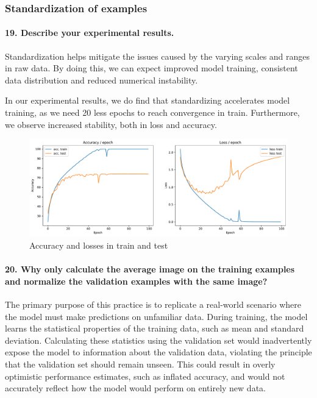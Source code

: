 \documentclass{article}
\theoremstyle{plain}%
\theoremstyle{definition}
\theoremstyle{remark}
\begin{document}
\subsubsection{Standardization of examples}
\paragraph{19. Describe your experimental results.}

Standardization helps mitigate the issues caused by the varying scales and ranges in raw data. By doing this, we can expect improved model training, consistent data distribution and reduced numerical instability.

In our experimental results, we do find that standardizing accelerates model training, as we need 20 less epochs to reach convergence in train. Furthermore, we observe increased stability, both in loss and accuracy.

\begin{figure}[H]
    \centering
    \includegraphics*[width=\textwidth]{figs/CNN/standardization.pdf}
    \caption{Accuracy and losses in train and test}
    \label{fig:standardization}
\end{figure}

\paragraph{20. Why only calculate the average image on the training examples and normalize the validation examples with the same image?}

The primary purpose of this practice is to replicate a real-world scenario where the model must make predictions on unfamiliar data. During training, the model learns the statistical properties of the training data, such as mean and standard deviation. Calculating these statistics using the validation set would inadvertently expose the model to information about the validation data, violating the principle that the validation set should remain unseen. This could result in overly optimistic performance estimates, such as inflated accuracy, and would not accurately reflect how the model would perform on entirely new data.
\end{document}
